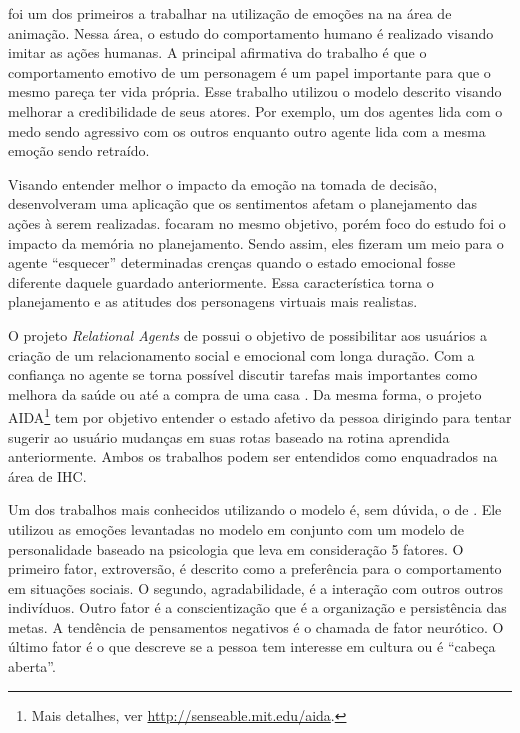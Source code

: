 \citet{bates1994role} foi um dos primeiros a trabalhar na utilização de emoções
na na área de animação. Nessa área, o estudo do comportamento humano é
realizado visando imitar as ações humanas. A principal afirmativa do trabalho
é que o comportamento emotivo de um personagem é um papel importante para que
o mesmo pareça ter vida própria. Esse trabalho utilizou o modelo descrito
visando melhorar a credibilidade de seus atores. Por exemplo, um dos agentes
lida com o medo sendo agressivo com os outros enquanto outro agente lida com a
mesma emoção sendo retraído.

Visando entender melhor o impacto da emoção na tomada de decisão,
\citet{zhang2009emotional} desenvolveram uma aplicação que os sentimentos
afetam o planejamento das ações à serem realizadas.
\citet{neto2010construction} focaram no mesmo objetivo, porém foco do estudo
foi o impacto da memória no planejamento. Sendo assim, eles fizeram um meio
para o agente ``esquecer'' determinadas crenças quando o estado emocional
fosse diferente daquele guardado anteriormente. Essa característica torna o
planejamento e as atitudes dos personagens virtuais mais realistas.

O projeto \emph{Relational Agents} de \citet{bick2003relational} possui o
objetivo de possibilitar aos usuários a criação de um relacionamento social e
emocional com longa duração. Com a confiança no agente se torna possível
discutir tarefas mais importantes como melhora da saúde ou até a compra de uma
casa \cite{bickmore2009virtual}. Da mesma forma, o projeto AIDA\footnote{Mais
detalhes, ver \url{http://senseable.mit.edu/aida}.} tem por objetivo entender
o estado afetivo da pessoa dirigindo para tentar sugerir ao usuário mudanças
em suas rotas baseado na rotina aprendida anteriormente. Ambos os trabalhos
podem ser entendidos como enquadrados na área de IHC.

Um dos trabalhos mais conhecidos utilizando o modelo \occ é, sem dúvida, o de
\citet{kshirsagar2002multilayer}. Ele utilizou
as emoções levantadas no modelo em conjunto com um modelo de personalidade
baseado na psicologia que leva em consideração 5 fatores. O primeiro fator,
extroversão, é descrito como a preferência para o comportamento em situações
sociais. O segundo, agradabilidade, é a interação com outros outros
indivíduos. Outro fator é a conscientização que é a organização e persistência
das metas. A tendência de pensamentos negativos é o chamada de fator
neurótico. O último fator é o que descreve se a pessoa tem interesse em
cultura ou é ``cabeça aberta''.

